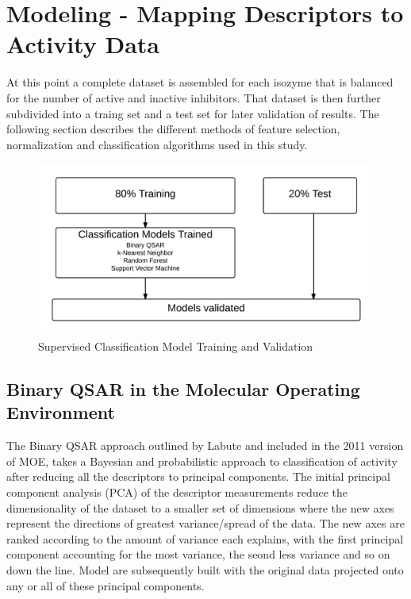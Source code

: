 \section{Modeling - Mapping Descriptors to Activity Data}

At this point a complete dataset is assembled for each isozyme that is balanced for the number of active and inactive inhibitors. That dataset is then further subdivided into a traing set and a test set for later validation of results. The following section describes the different methods of feature selection, normalization and classification algorithms used in this study.

\begin{figure}[H]
  \centering
   \includegraphics[width=1\textwidth]{../img/Model_validation.png}
  \caption{Supervised Classification Model Training and Validation}
\end{figure}

\subsection{Binary QSAR in the Molecular Operating Environment}

The Binary QSAR approach outlined by Labute \cite{Labute1999} and included in the 2011 version of MOE, takes a Bayesian and probabilistic approach to classification of activity after reducing all the descriptors to principal components. The initial principal component analysis (PCA) of the descriptor measurements reduce the dimensionality of the dataset to a smaller set of dimensions where the new axes represent the directions of greatest variance/spread of the data. The new axes are ranked according to the amount of variance each explains, with the first principal component accounting for the most variance, the seond less variance and so on down the line. Model are subsequently built with the original data projected onto any or all of these principal components.

